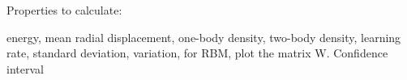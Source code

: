 Properties to calculate:

energy, mean radial displacement, one-body density, two-body density, learning rate, standard deviation, variation, for RBM, plot the matrix W.
Confidence interval 